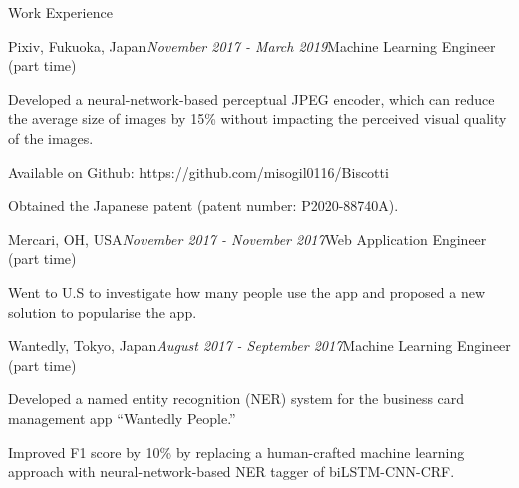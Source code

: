 \begin{rSection}{Work Experience}
\begin{rSubsection}{Pixiv, Fukuoka, Japan}{\em November 2017 - March 2019}{Machine Learning Engineer (part time)}{}
\item Developed a neural-network-based perceptual JPEG encoder, which can reduce the average size of images by 15\% without impacting the perceived visual quality of the images.
\item Available on Github: https://github.com/misogil0116/Biscotti
\item Obtained the Japanese patent (patent number: P2020-88740A).
\end{rSubsection}

\begin{rSubsection}{Mercari, OH, USA}{\em November 2017 - November 2017}{Web Application Engineer (part time)}{}
\item Went to U.S to investigate how many people use the app and proposed a new solution to popularise the app.
\end{rSubsection}

\begin{rSubsection}{Wantedly, Tokyo, Japan}{\em August 2017 - September 2017}{Machine Learning Engineer (part time)}{}
\item Developed a named entity recognition (NER) system for the business card management app ``Wantedly People.'' 
\item Improved F1 score by 10\% by replacing a human-crafted machine learning approach with neural-network-based NER tagger of biLSTM-CNN-CRF.
\end{rSubsection}

\end{rSection}